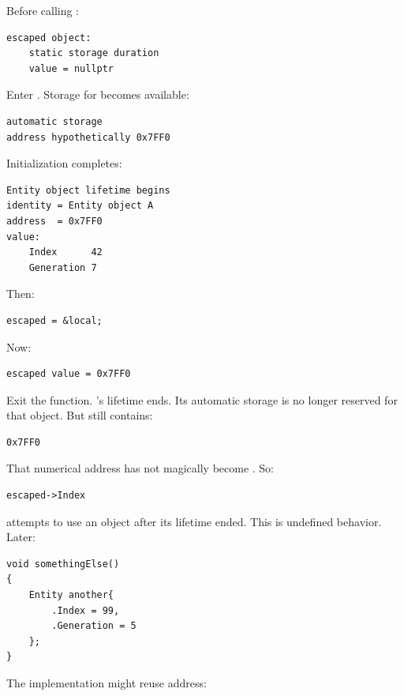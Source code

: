 Before calling :

\begin{verbatim}
escaped object:
    static storage duration
    value = nullptr
\end{verbatim}

Enter . Storage for  becomes available:

\begin{verbatim}
automatic storage
address hypothetically 0x7FF0
\end{verbatim}

Initialization completes:

\begin{verbatim}
Entity object lifetime begins
identity = Entity object A
address  = 0x7FF0
value:
    Index      42
    Generation 7
\end{verbatim}

Then:

\begin{verbatim}
escaped = &local;
\end{verbatim}

Now:

\begin{verbatim}
escaped value = 0x7FF0
\end{verbatim}

Exit the function. 's lifetime ends. Its automatic storage is no longer reserved for that object. But  still contains:

\begin{verbatim}
0x7FF0
\end{verbatim}

That numerical address has not magically become . So:

\begin{verbatim}
escaped->Index
\end{verbatim}

attempts to use an object after its lifetime ended. This is undefined behavior. Later:

\begin{verbatim}
void somethingElse()
{
    Entity another{
        .Index = 99,
        .Generation = 5
    };
}
\end{verbatim}

The implementation might reuse address:

